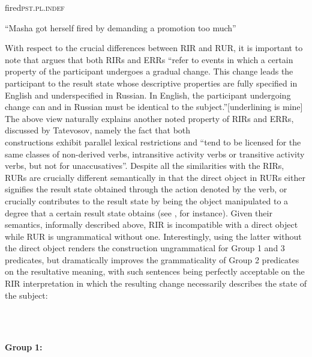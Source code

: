 \documentclass[output=paper,modfonts, nonflat]{langsci/langscibook}
\begin{document}
\begin{styleinnerExample}
\begin{styleinnerExample}
    fired\textsc{pst.pl.indef}
\end{styleinnerExample}

\begin{styleinnerExample}
    “Masha got herself fired by demanding a promotion too much”
\end{styleinnerExample}

With respect to the crucial differences between RIR and RUR, it is important to note that \citet{Tatevosov2010} argues that both RIRs and ERRs “refer to events in which a certain property of the participant undergoes a gradual change. This change leads the participant to the result state whose descriptive properties are fully specified in English and underspecified in Russian. In English, the participant undergoing change can and in Russian must be identical to the subject.”[underlining is mine] The above view naturally explains another noted property of RIRs and ERRs, discussed by Tatevosov, namely the fact that both\\
constructions exhibit parallel lexical restrictions and “tend to be licensed for the same classes of non-derived verbs, intransitive activity verbs or transitive activity verbs, but not for unaccusatives”. Despite all the similarities with the RIRs, RURs are crucially different semantically in that the direct object in RURs either signifies the result state obtained through the action denoted by the verb, or crucially contributes to the result state by being the object manipulated to a degree that a certain result state obtains (see , for instance). Given their semantics, informally described above, RIR is incompatible with a direct object while RUR is ungrammatical without one. Interestingly, using the latter without the direct object renders the construction ungrammatical for Group 1 and 3 predicates, but dramatically improves the grammaticality of Group 2 predicates on the resultative meaning, with such sentences being perfectly acceptable on the RIR interpretation in which the resulting change necessarily describes the state of the subject:

\begin{styleinnerExample}
\ea%
    \label{ex:key:44}
    \gll\\
        \\
    \glt
    \z

          \textbf{Group} \textbf{1:}
\end{styleinnerExample}


\end{styleinnerExample}
\end{document}
